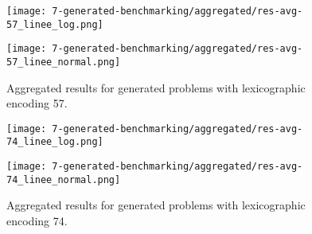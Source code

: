 \begin{figure}[H]
  \centering
  \begin{minipage}{1\textwidth}
    \centering
    \texttt{[image: 7-generated-benchmarking/aggregated/res-avg-57\_linee\_log.png]}
  \end{minipage}
  \hfill
  \begin{minipage}{1\textwidth}
    \centering
    \texttt{[image: 7-generated-benchmarking/aggregated/res-avg-57\_linee\_normal.png]}
  \end{minipage}
  \caption{Aggregated results for generated problems with lexicographic encoding 57.}\label{fig:agg-le57}
\end{figure}

\begin{figure}[H]
  \centering
  \begin{minipage}{1\textwidth}
    \centering
    \texttt{[image: 7-generated-benchmarking/aggregated/res-avg-74\_linee\_log.png]}
  \end{minipage}
  \hfill
  \begin{minipage}{1\textwidth}
    \centering
    \texttt{[image: 7-generated-benchmarking/aggregated/res-avg-74\_linee\_normal.png]}
  \end{minipage}
  \caption{Aggregated results for generated problems with lexicographic encoding 74.}\label{fig:agg-le74}
\end{figure}

